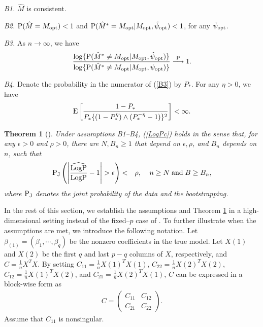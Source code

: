 \documentclass[12pt]{article} %
\newtheorem{theorem}{Theorem}
\theoremstyle{definition}
\begin{document}
{\it B1.} $\hat{M}$ is consistent.

 {\it B2.} ${\rm P}(\hat{M}=M_{\rm opt})<1$ and ${\rm P}(\hat{M}^{*}=M_{\rm opt}|M_{\rm opt},\tilde{\psi}_{\rm opt})<1$, for any $\tilde{\psi}_{\rm opt}$.
 
 {\it B3.} As $n\rightarrow\infty$, we have
\begin{eqnarray}
 \frac{\log\{{\rm P}(\hat{M}^{*}\neq M_{\rm opt}|M_{\rm opt},\hat{\psi}_{\rm opt})\}}{\log\{{\rm
 P}(\hat{M}^{*}\neq M_{\rm opt}|M_{\rm opt},\psi_{\rm opt})\}}\stackrel{\rm P}{\longrightarrow}1. \label{B3}
 \end{eqnarray}
 
 {\it B4.} Denote the probability in the numerator of (\ref{B3}) by $P_{*}$. For any $\eta>0$, we have
 \begin{eqnarray}
 {\rm E}\left[\frac{1-P_{*}}{P_{*}\{(1-P_{*}^{\eta})\wedge(P_{*}^{-\eta}-1)\}^{2}}\right]
 <\infty.
 \end{eqnarray}

 \begin{theorem}[\citet{Liu2021}]
 \label{th:logp}
 Under assumptions {\it B1}--{\it B4}, (\ref{LogPc}) holds in the sense that, for any $\epsilon>0$ and
 $\rho>0$, there are $N, B_{n}\geq 1$ that depend on $\epsilon, \rho$, and $B_{n}$ depends on 
 $n$, such that
 \begin{eqnarray}
 {\rm P}_{\rm J}\left(\left|\frac{\widehat{\rm LogP}}{\rm LogP}-1\right|>\epsilon\right)&<&\rho,
 \;\;\;\;n\geq N\;{\rm and}\;B\geq B_{n},
 \end{eqnarray}
 where ${\rm P}_{\rm J}$ denotes the joint probability of the data and the bootstrapping.
 \end{theorem}
 
In the rest of this section, we establish the assumptions and Theorem \ref{th:logp} in a high-dimensional setting instead of the fixed–$p$ case of \citet{Liu2021}. To further illustrate when the assumptions are met, we introduce the following notation. Let $\beta_{(1)}=(\beta_1, \cdots, \beta_q)$ be the nonzero coefficients in the true model. Let $X(1)$ and $X(2)$ be the first $q$ and last $p-q$ columns of $X$, respectively, and $C = \frac{1}{n}X^TX$. By setting
$C_{11} = \frac{1}{n}X(1)^TX(1)$, $C_{22} = \frac{1}{n}X(2)^TX(2)$, $C_{12} = \frac{1}{n}X(1)^TX(2)$, and $C_{21} = \frac{1}{n}X(2)^TX(1)$, $C$ can
be expressed in a block-wise form as
\begin{eqnarray}
   C=
\begin{pmatrix}
C_{11} & C_{12} \\
C_{21} & C_{22}
\end{pmatrix}. 
\end{eqnarray}
Assume that $C_{11}$ is nonsingular.
\end{document}
